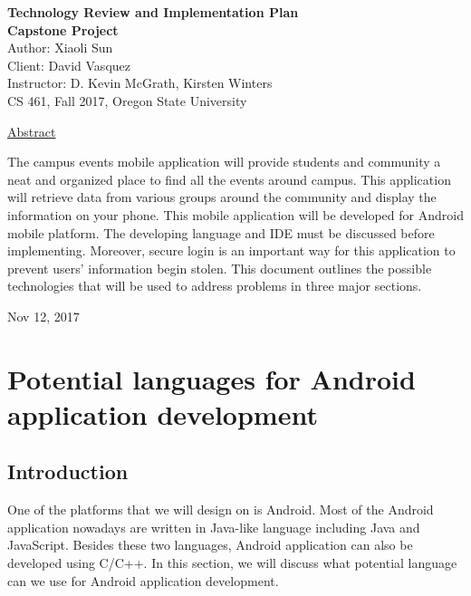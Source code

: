 \documentclass[letterpaper, 10pt,titlepage]{article}
\newcommand\tab[1][1cm]{\hspace*{#1}}
\begin{document}
\begin{titlepage}
\begin{center}
    \Huge
    \textbf{Technology Review and Implementation Plan}\\
    \textbf{Capstone Project}\\
    \vspace{1.0cm}
    \large
    Author: Xiaoli Sun\\
    \large
    Client: David Vasquez\\
    \vspace{1.5cm}
    \large
    Instructor: D. Kevin McGrath, Kirsten Winters\\

    \large
    CS 461, Fall 2017, Oregon State University\\    

    \vspace{3.2cm}

    \large
    \underline{Abstract}\\
    \vspace{0.3cm}
    \end{center}
    \large

    \tab The campus events mobile application will provide students and community a neat and organized place to find all the events around campus. This application will retrieve data from various groups around the community and display the information on your phone. This mobile application will be developed for Android mobile platform. The developing language and IDE must be discussed before implementing. Moreover, secure login is an important way for this application to prevent users' information begin stolen. This document outlines the possible technologies that will be used to address problems in three major sections.
    
    \vspace{0.8cm}
    \vfill
    
\begin{center}    
    Nov 12, 2017

\end{center}
\end{titlepage}


\tableofcontents
\newpage

\section{Potential languages for Android application development}

\subsection{Introduction}
One of the platforms that we will design on is Android. Most of the Android application nowadays are written in Java-like language including Java and JavaScript. Besides these two languages, Android application can also be developed using C/C++. In this section, we will discuss what potential language can we use for Android application development. \\
\end{document}
